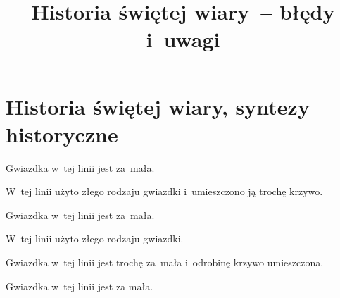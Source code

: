 \documentclass[a4paper,11pt]{article}
\title{Historia świętej wiary~-- błędy i~uwagi}
\begin{document}





\maketitle  %





\section{Historia świętej wiary, syntezy historyczne}

\vspace{\spaceTwo}






\start {} Gwiazdka w~tej linii jest za~mała.

\vspace{\spaceFour}


\start {} W~tej linii użyto złego rodzaju gwiazdki
i~umieszczono ją trochę krzywo.

\vspace{\spaceFour}


\start {} Gwiazdka w~tej linii jest za~mała.

\vspace{\spaceFour}


\start {} W~tej linii użyto złego rodzaju gwiazdki.

\vspace{\spaceFour}


\start {} Gwiazdka w~tej linii jest trochę za~mała
i~odrobinę krzywo umieszczona.

\vspace{\spaceFour}


\start {} Gwiazdka w~tej linii jest za mała.

\vspace{\spaceFour}
\end{document}
